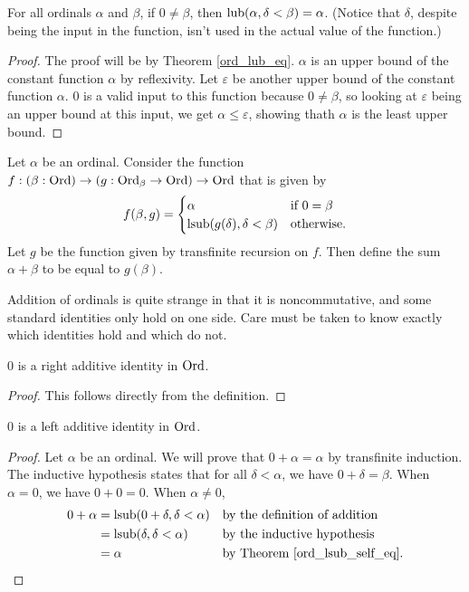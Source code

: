 \documentclass[../../math.tex]{subfiles}
\begin{document}
\begin{theorem} \label{ord_lub_constant}
    For all ordinals $\alpha$ and $\beta$, if $0 \neq \beta$, then $\operatorname{lub}(\alpha,
    \delta < \beta) = \alpha$.  (Notice that $\delta$, despite being the input
    in the function, isn't used in the actual value of the function.)
\end{theorem}
\begin{proof}
    The proof will be by Theorem \ref{ord_lub_eq}.  $\alpha$ is an upper bound
    of the constant function $\alpha$ by reflexivity.  Let $\varepsilon$ be
    another upper bound of the constant function $\alpha$.  $0$ is a valid input
    to this function because $0 \neq \beta$, so looking at $\varepsilon$ being
    an upper bound at this input, we get $\alpha \leq \varepsilon$, showing
    thath $\alpha$ is the least upper bound.
\end{proof}

\begin{instance}
    Let $\alpha$ be an ordinal.  Consider the function $f : (\beta : \operatorname{Ord}) \to
    (g : \operatorname{Ord}_\beta \to \operatorname{Ord}) \to \operatorname{Ord}$ that is given by
    \[
        f(\beta, g) = \begin{cases}
            \alpha &\text{if $0 = \beta$} \\
            \operatorname{lsub}(g(\delta), \delta < \beta) &\text{otherwise.}
        \end{cases}
    \]
    Let $g$ be the function given by transfinite recursion on $f$.  Then define
    the sum $\alpha + \beta$ to be equal to $g(\beta)$.
\end{instance}

Addition of ordinals is quite strange in that it is noncommutative, and some
standard identities only hold on one side.  Care must be taken to know exactly
which identities hold and which do not.

\begin{instance}
    $0$ is a right additive identity in $\operatorname{Ord}$.
\end{instance}
\begin{proof}
    This follows directly from the definition.
\end{proof}

\begin{instance}
    $0$ is a left additive identity in $\operatorname{Ord}$.
\end{instance}
\begin{proof}
    Let $\alpha$ be an ordinal.  We will prove that $0 + \alpha = \alpha$ by
    transfinite induction.  The inductive hypothesis states that for all $\delta
    < \alpha$, we have $0 + \delta = \beta$.  When $\alpha = 0$, we have $0 + 0 =
    0$.  When $\alpha \neq 0$,
    \begin{align*}
        0 + \alpha
        &= \operatorname{lsub}(0 + \delta, \delta < \alpha)
            && \text{by the definition of addition} \\
        &= \operatorname{lsub}(\delta, \delta < \alpha)
            && \text{by the inductive hypothesis} \\
        &= \alpha
            && \text{by Theorem \ref{ord_lsub_self_eq}.} \\
    \end{align*}
\end{proof}
\end{document}
